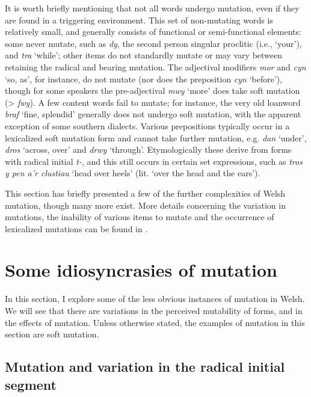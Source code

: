 \documentclass[output=paper,colorlinks,citecolor=brown]{langscibook}
\begin{document}
{It is worth briefly mentioning that not all words undergo mutation, even if they are found in a triggering environment. This set of non-mutating words is relatively small, and generally consists of functional or semi-functional elements: some never mutate, such as} {\textit{dy}}{, the second person singular proclitic (i.e., ‘your’), and} {\textit{tra}}{ ‘while’; other items do not standardly mutate or may vary between retaining the radical and bearing mutation. The adjectival modifiers} {\textit{mor} }{and} {\textit{cyn} }{‘so, as’, for instance, do not mutate (nor does the preposition} {\textit{cyn}}{ ‘before’), though for some speakers the pre-adjectival} {\textit{mwy}}{ ‘more’ does take  soft mutation (>} {\textit{fwy}}{). A few content words fail to mutate; for instance, the very old loanword} {\textit{braf}} {‘fine, splendid’ generally does not undergo  soft mutation, with the apparent exception of some southern dialects. Various prepositions typically occur in a lexicalized  soft mutation form and cannot take further mutation, e.g.} {\textit{dan} }{‘under’,} {\textit{dros} }{‘across, over’ and} {\textit{drwy}}{ ‘through’. Etymologically these derive from forms with radical initial} {\textit{t-}}{, and this still occurs in certain set expressions, such as} {\textit{tros y pen a’r clustiau}}{ ‘head over heels’ (lit. ‘over the head and the ears’).} 


This section has briefly presented a few of the further complexities of Welsh mutation, though many more exist. More details concerning the variation in mutations, the inability of various items to mutate and the occurrence of lexicalized mutations can be found in \citet{Morgan1952}. 

\section{Some idiosyncrasies of mutation}\label{sec:tallerman:4}

In this section, I explore some of the less obvious instances of mutation in Welsh. We will see that there are variations in the perceived mutability of forms, and in the effects of mutation. Unless otherwise stated, the examples of mutation in this section are soft mutation. 


\subsection{Mutation and variation in the radical initial segment}
\end{document}
